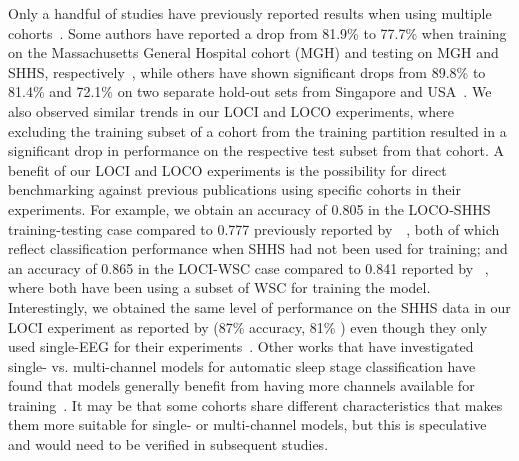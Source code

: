 Only a handful of studies have previously reported results when using multiple cohorts~\cite{Stephansen2018, Biswal2018a, Patanaik2018}.
Some authors have reported a drop from 81.9\% to 77.7\% when training on the Massachusetts General Hospital cohort (MGH) and testing on MGH and SHHS, respectively~\cite{Biswal2018a}, while others have shown significant drops from 89.8\% to 81.4\% and 72.1\% on two separate hold-out sets from Singapore and USA~\cite{Patanaik2018}.
We also observed similar trends in our LOCI and LOCO experiments, where excluding the training subset of a cohort from the training partition resulted in a significant drop in performance on the respective test subset from that cohort.
A benefit of our LOCI and LOCO experiments is the possibility for direct benchmarking against previous publications using specific cohorts in their experiments.
For example, we obtain an accuracy of 0.805 in the LOCO-SHHS training-testing case compared to 0.777 previously reported by~\citeauthor{Biswal2018a}~\cite{Biswal2018a}, both of which reflect classification performance when SHHS had not been used for training; and an accuracy of 0.865 in the LOCI-WSC case compared to 0.841 reported by \citeauthor{Olesen2018c}~\cite{Olesen2018c}, where both have been using a subset of WSC for training the model. 
Interestingly, we obtained the same level of performance on the SHHS data in our LOCI experiment as reported by \citeauthor{Sors2018} (87\% accuracy, 81\% \cohen) even though they only used single-EEG for their experiments~\cite{Sors2018}.
Other works that have investigated single- vs. multi-channel models for automatic sleep stage classification have found that models generally benefit from having more channels available for training~\cite{Chambon2018c, Biswal2018a, Phan2019a}.
It may be that some cohorts share different characteristics that makes them more suitable for single- or multi-channel models, but this is speculative and would need to be verified in subsequent studies.

